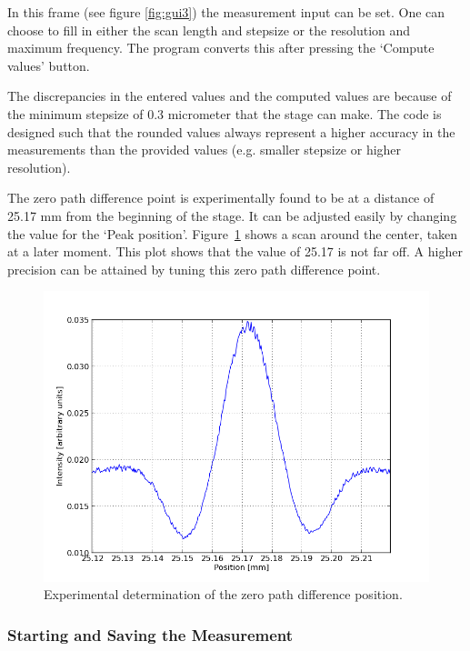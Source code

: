 In this frame (see figure \ref{fig:gui3}) the measurement input can be set. One can choose to fill in either the scan length and stepsize or the resolution and maximum frequency. The program converts this after pressing the `Compute values' button.

The discrepancies in the entered values and the computed values are because of the minimum stepsize of 0.3 micrometer that the stage can make. The code is designed such that the rounded values always represent a higher accuracy in the measurements than the provided values (e.g. smaller stepsize or higher resolution).

The zero path difference point is experimentally found to be at a distance of 25.17 mm from the beginning of the stage. It can be adjusted easily by changing the value for the `Peak position'. Figure~\ref{fig:peakposition} shows a scan around the center, taken at a later moment. This plot shows that the value of 25.17 is not far off. A higher precision can be attained by tuning this zero path difference point.

\begin{figure}[!ht]
 \begin{center}
  \includegraphics[width=\textwidth]{figures/peakposition}
  \caption{Experimental determination of the zero path difference position.}
  \label{fig:peakposition}
 \end{center}
\end{figure}


\subsubsection{Starting and Saving the Measurement}\label{subsub:saving}

